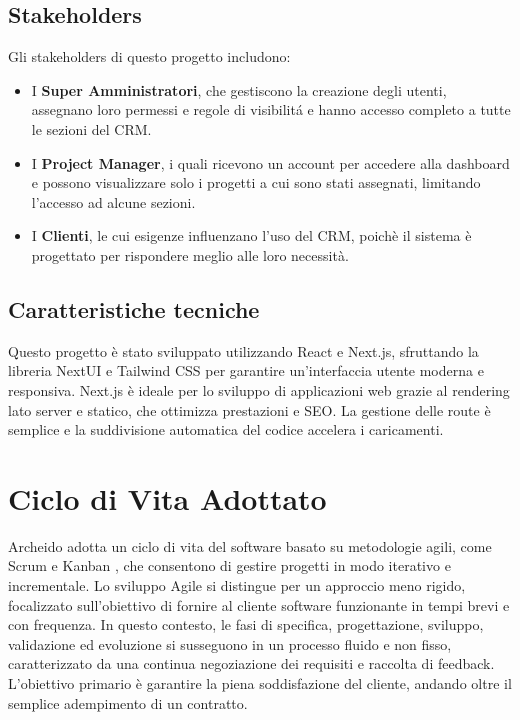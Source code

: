 \documentclass[target=bach,aauheader=,style=]{thud}
\begin{document}
\subsection{Stakeholders}
Gli stakeholders di questo progetto includono:

\begin{itemize}
    \item I \textbf{Super Amministratori}, che gestiscono la creazione degli utenti, assegnano loro permessi e regole di visibilitá e hanno accesso completo a tutte le sezioni del CRM. 
    \item I \textbf{Project Manager}, i quali ricevono un account per accedere alla dashboard e possono visualizzare solo i progetti a cui sono stati assegnati, limitando l'accesso ad alcune sezioni.
    \item I \textbf{Clienti}, le cui esigenze influenzano l'uso del CRM, poichè il sistema è progettato per rispondere meglio alle loro necessità.
\end{itemize}

\subsection{Caratteristiche tecniche}
Questo progetto è stato sviluppato utilizzando React e Next.js, sfruttando la libreria NextUI e Tailwind CSS per garantire un'interfaccia utente moderna e responsiva. Next.js \cite{nextjs2024} è ideale per lo sviluppo di applicazioni web grazie al rendering lato server e statico, che ottimizza prestazioni e SEO. La gestione delle route è semplice e la suddivisione automatica del codice accelera i caricamenti.

\section{Ciclo di Vita Adottato}
Archeido adotta un ciclo di vita del software basato su metodologie agili, come Scrum \cite{scrumwiki2024} e Kanban \cite{kanbanwiki2024}, che consentono di gestire progetti in modo iterativo e incrementale. Lo sviluppo Agile si distingue per un approccio meno rigido, focalizzato sull'obiettivo di fornire al cliente software funzionante in tempi brevi e con frequenza. In questo contesto, le fasi di specifica, progettazione, sviluppo, validazione ed evoluzione si susseguono in un processo fluido e non fisso, caratterizzato da una continua negoziazione dei requisiti e raccolta di feedback. L'obiettivo primario è garantire la piena soddisfazione del cliente, andando oltre il semplice adempimento di un contratto.
\end{document}
